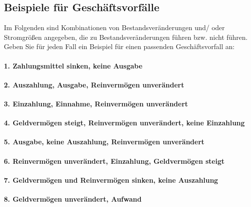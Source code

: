 \documentclass[paper=a4, fontsize=11pt]{scrartcl}
\numberwithin{equation}{section}
\numberwithin{figure}{section}
\numberwithin{table}{section}
\begin{document}
\subsection{Beispiele für Geschäftsvorfälle}
Im Folgenden sind Kombinationen von Bestandsveränderungen und/ oder Stromgrößen angegeben, die zu Bestandsveränderungen führen bzw. nicht führen. Geben Sie für jeden Fall ein Beispiel für einen passenden Geschäftsvorfall an: \\

\paragraph{1. Zahlungsmittel sinken, keine Ausgabe}

\paragraph{2. Auszahlung, Ausgabe, Reinvermögen unverändert}

\paragraph{3. Einzahlung, Einnahme, Reinvermögen unverändert}

\paragraph{4. Geldvermögen steigt, Reinvermögen unverändert, keine Einzahlung}

\paragraph{5. Ausgabe, keine Auszahlung, Reinvermögen unverändert}

\paragraph{6. Reinvermögen unverändert, Einzahlung, Geldvermögen steigt}

\paragraph{7. Geldvermögen und Reinvermögen sinken, keine Auszahlung}

\paragraph{8. Geldvermögen unverändert, Aufwand}
\end{document}
